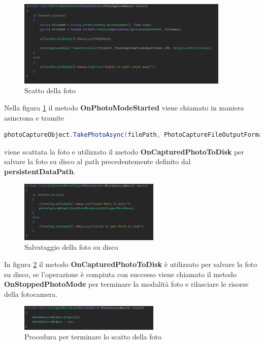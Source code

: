 \begin{figure}[H]
    \centering
    \includegraphics[width=0.9\textwidth,height=\textheight,keepaspectratio]{figures/chapter_1/OnPhotoModeStarted_CODICE.png}
    \caption{Scatto della foto}
    \label{fig:onPhotoModeStarted}
\end{figure}
Nella figura \ref{fig:onPhotoModeStarted} il metodo \textbf{OnPhotoModeStarted} viene chiamato in maniera asincrona e tramite
\begin{lstlisting}[language=java]
    photoCaptureObject.TakePhotoAsync(filePath, PhotoCaptureFileOutputFormat.JPG, OnCapturedPhotoToDisk); 
\end{lstlisting}
    viene scattata la foto e utilizzato il metodo \textbf{OnCapturedPhotoToDisk} per salvare la foto su disco al path precedentemente definito dal \textbf{persistentDataPath}.

\begin{figure}[H]
    \centering
    \includegraphics[width=0.6\textwidth,height=\textheight,keepaspectratio]{figures/chapter_1/OnCapturedPhotoToDisk_CODICE.png}
    \caption{Salvataggio della foto su disco}
    \label{fig:onCapturedPhotoToDisk}
\end{figure}

In figura \ref{fig:onCapturedPhotoToDisk} il metodo \textbf{OnCapturedPhotoToDisk} è utilizzato per salvare la foto su disco, se l'operazione è compiuta con successo viene chiamato il metodo \textbf{OnStoppedPhotoMode} per terminare la modalità foto e rilasciare le risorse della fotocamera.


\begin{figure}[H]
    \centering
    \includegraphics[width=0.6\textwidth,height=\textheight,keepaspectratio]{figures/chapter_1/OnStoppedPhotoMode_CODICE.png}
    \caption{Procedura per terminare lo scatto della foto}
    \label{fig:onStoppedPhotoMode}
\end{figure}

